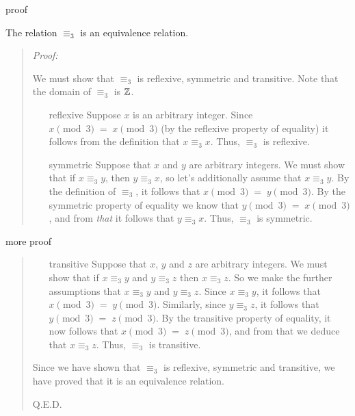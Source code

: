 \documentclass[handout,landscape]{beamer}
\begin{document}
\begin{frame}{proof}
\begin{thm*}
The relation $\equiv_3$ is an equivalence relation.
\end{thm*} \pause

\begin{quote} \emph{Proof:}

We must show that $\equiv_3$ is reflexive, symmetric and transitive.  Note that the domain of $\equiv_3$ is ${\mathbb Z}$.
\pause

\begin{itemize}
\item[reflexive] Suppose $x$ is an arbitrary integer.  Since $x \pmod{3} \; = \; x \pmod{3}$ (by the reflexive property of equality) it follows from the definition that $x \equiv_3 x$.  Thus, $\equiv_3$ is reflexive. \pause
\item[symmetric] Suppose that $x$ and $y$ are arbitrary integers.  We must show that if $x \equiv_3 y$, then $y \equiv_3 x$, so let's additionally assume that $x \equiv_3 y$.  By the definition of $\equiv_3$, it follows that $x \pmod{3} \; = \; y \pmod{3}$.  By the symmetric property of equality we know that $y \pmod{3} \; = \; x \pmod{3}$, and from {\em that} it follows that $y \equiv_3 x$.  Thus, $\equiv_3$ is symmetric.
\end{itemize}
\end{quote}
\end{frame}

\begin{frame}{more proof}

\begin{quote}
\begin{itemize}
\item[transitive] Suppose that $x$, $y$ and $z$ are arbitrary integers.  We must show that if $x \equiv_3 y$ and $y \equiv_3 z$ then $x \equiv_3 z$.  So we make the further assumptions that $x \equiv_3 y$ and $y \equiv_3 z$.  Since $x \equiv_3 y$, it follows that $x \pmod{3} \; = \; y \pmod{3}$.  Similarly, since $y \equiv_3 z$, it follows that $y \pmod{3} \; = \; z \pmod{3}$.  By the transitive property of equality, it now follows that $x \pmod{3} \; = \; z \pmod{3}$, and from that we deduce that $x \equiv_3 z$.  Thus, $\equiv_3$ is transitive. \pause
\end{itemize}

Since we have shown that $\equiv_3$ is reflexive, symmetric and transitive, we have proved that it is an equivalence relation.

\rule{0pt}{0pt} \newline \rule{0pt}{15pt} \hfill Q.E.D. 

\end{quote}
\end{frame}
\end{document}

